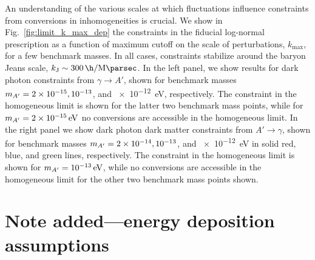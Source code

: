 \documentclass[prd,aps,10pt,nofootinbib,twocolumn,superscriptaddress,preprintnumbers,balancelastpage,longbibliography]{revtex4-1}
\begin{document}
An understanding of the various scales at which fluctuations influence constraints from conversions in inhomogeneities is crucial. We show in Fig.~\ref{fig:limit_k_max_dep} the constraints in the fiducial log-normal prescription as a function of maximum cutoff on the scale of perturbations, $k_\mathrm{max}$, for a few benchmark masses. In all cases, constraints stabilize around the baryon Jeans scale, $k_\mathrm{J}\sim \SI{300}{\h\per\mega\parsec}$. In the left panel, we show results for dark photon constraints from $\gamma\to A'$, shown for benchmark masses $m_{A^\prime} = 2\times10^{-15}, 10^{-13}$, and \SI{e-12}{\eV}, respectively. The constraint in the homogeneous limit is shown for the latter two benchmark mass points, while for $\mAp = \SI{2e-15}{\eV}$ no conversions are accessible in the homogeneous limit. In the right panel we show dark photon dark matter constraints from $A' \to \gamma$, shown for benchmark masses $m_{A^\prime} = 2\times10^{-14}, 10^{-13}$, and \SI{e-12}{\eV} in solid red, blue, and green lines, respectively. The constraint in the homogeneous limit is shown for $\mAp = \SI{e-13}{\eV}$, while no conversions are accessible in the homogeneous limit for the other two benchmark mass points shown.

\section{Note added---energy deposition assumptions}
\label{app:energy_dep_assumptions}
\end{document}
